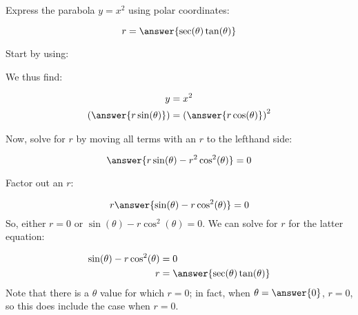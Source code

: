 \documentclass{ximera}
\author{Jim Talamo }
\begin{document}
\begin{exercise}

Express the parabola $y= x^2$ using polar coordinates:

\[
r= \answer{\sec(\theta)\tan(\theta)}
\]

\begin{hint}
Start by using:

\begin{multipleChoice}
\end{multipleChoice}

We thus find:

\begin{align*}
y &= x^2 \\
\left( \answer{r \sin(\theta)} \right) &= \left( \answer{r \cos(\theta)} \right)^2
\end{align*}

Now, solve for $r$ by moving all terms with an $r$ to the lefthand side:

\[
\answer{r \sin(\theta) - r^2 \cos^2(\theta)} =0
\]

Factor out an $r$:

\[
r \answer{ \sin(\theta) -r  \cos^2(\theta)} = 0
\]
So, either $r=0$ or $ \sin(\theta) -r  \cos^2(\theta) = 0$.  We can solve for $r$ for the latter equation:

\begin{align*}
\sin(\theta) -r  \cos^2(\theta) &= 0 \\
r &= \answer{\sec(\theta)\tan(\theta)}
\end{align*}
Note that there is a $\theta$ value for which $r=0$; in fact, when $\theta = \answer{0}$, $r=0$, so this does include the case when $r=0$.

\end{hint}

\end{exercise}
\end{document}
